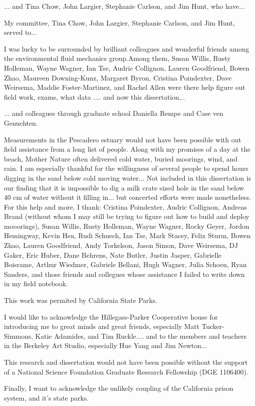 

... and Tina Chow, John Largier, Stephanie Carlson, and Jim Hunt, who have... 

My committee, Tina Chow, John Largier, Stephanie Carlson, and Jim Hunt, served to... 

I was lucky to be surrounded by brilliant colleagues and wonderful friends among the environmental fluid mechanics group.Among them, Susan Willis, Rusty Holleman, Wayne Wagner, Ian Tse, Audric Collignon, Lauren Goodfriend, Bowen Zhao, Maureen Downing-Kunz, Margaret Byron, Cristina Poindexter, Dave Weirsema, Maddie Foster-Martinez, and Rachel Allen were there help figure out field work, exams, what data .... and now this dissertation,.. 


... and colleagues through graduate school Daniella Rempe and Case ven Genuchten. 

Measurements in the Pescadero estuary would not have been possible with out field assistance from a long list of people. Along with my promises of a day at the beach, Mother Nature often delivered cold water, buried moorings, wind, and rain. I am especially thankful for the willingness of several people to spend hours digging in the sand below cold moving water... Not included in this dissertation is our finding that it is impossible to dig a milk crate sized hole in the sand below 40 cm of water without it filling in... but concerted efforts were made nonetheless.  For this help and more, I thank: Cristina Poindexter, Audric Collignon, Andreas Brand (without whom I may still be trying to figure out how to build and deploy mooorings), Susan Willis, Rusty Holleman, Wayne Wagner, Rocky Geyer, Jordon Hemingway, Kevin Hsu, Rudi Schuech, Ian Tse, Mark Stacey, Felix Sturm, Bowen Zhao, Lauren Goodfriend, Andy Torkelson, Jason Simon, Dave Weirsema, DJ Gaker, Eric Huber, Dane Behrens, Nate Butler, Justin Jasper, Gabrielle Boisrame, Arthur Wiedmer, Gabriele Bellani, Hugh Wagner, Julia Schoen, Ryan Sanders, and those friends and collegues whose assistance I failed to write down in my field notebook. 

This work was permited by California State Parks.

I would like to acknowledge the Hillegass-Parker Cooperative house for introducing me to great minds and great friends, especially Matt Tucker-Simmons, Katie Adamides, and Tim Ruckle.... and to the members and teachers in the Berkeley Art Studio, especially Hue Yang and Jim Newton...

This research and dissertation would not have been possible without the support of a National Science Foundation Graduate Research Fellowship (DGE 1106400).

Finally, I want to acknowledge the unlikely coupling of the California prison system, and it's state parks. 